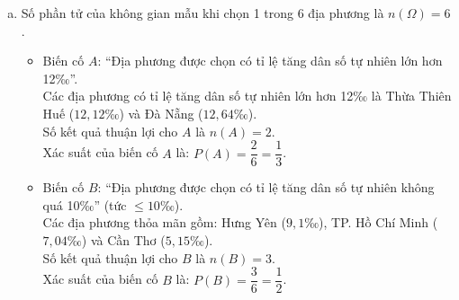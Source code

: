 \begin{bt}
{\begin{enumerate}[a)]
\begin{itemize}
        \item Cần Thơ: $13{,}5 - 8{,}35 = 5{,}15$‰.
    \end{itemize}
    So sánh các tỉ lệ trên, ta thấy $12{,}64$‰ là lớn nhất.\\
    Vậy Đà Nẵng là địa phương có tỉ lệ tăng dân số tự nhiên lớn nhất năm 2022 trong các địa phương đã cho.
    \item Số phần tử của không gian mẫu khi chọn 1 trong 6 địa phương là $n(\Omega) = 6$.
    \begin{itemize}
        \item Biến cố $A$: “Địa phương được chọn có tỉ lệ tăng dân số tự nhiên lớn hơn 12‰”.\\
        Các địa phương có tỉ lệ tăng dân số tự nhiên lớn hơn 12‰ là Thừa Thiên Huế ($12{,}12$‰) và Đà Nẵng ($12{,}64$‰).\\
        Số kết quả thuận lợi cho $A$ là $n(A) = 2$.\\
        Xác suất của biến cố $A$ là:
        $P(A) = \dfrac{2}{6} = \dfrac{1}{3}$.
        \item Biến cố $B$: “Địa phương được chọn có tỉ lệ tăng dân số tự nhiên không quá 10‰” (tức $\le 10$‰).\\
        Các địa phương thỏa mãn gồm: Hưng Yên ($9{,}1$‰), TP. Hồ Chí Minh ($7{,}04$‰) và Cần Thơ ($5{,}15$‰).\\
        Số kết quả thuận lợi cho $B$ là $n(B) = 3$.\\
        Xác suất của biến cố $B$ là:
        $P(B) = \dfrac{3}{6} = \dfrac{1}{2}$.
    \end{itemize}
\end{enumerate}
}
\end{bt}

